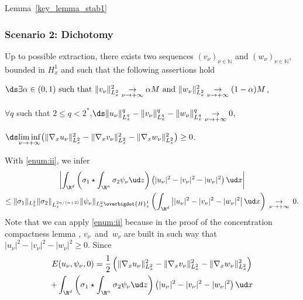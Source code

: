 \begin{ProofOf}{Lemma~\ref{key_lemma_stab1}}
\subsubsection*{Scenario 2: Dichotomy} Up to possible extraction, there exists two sequences $(v_{\nu})_{\nu\in\mathbb N}$ and $(w_{\nu})_{\nu\in\mathbb N}$, bounded in $H_{x}^{1}$
and such that the following assertions hold
\begin{enumeratei}
\item\label{enum:i}
$\ds \exists\alpha\in(0,1)\text{ such that }\|v_{\nu}\|_{L_{x}^{2}}^{2}\underset{\nu\to+\infty}{\to}\alpha M\text{ and }\|w_{\nu}\|_{L_{x}^{2}}^{2}\underset{\nu\to+\infty}{\to}(1-\alpha)M$,
\item
\label{enum:ii}
$\forall q$ such that $2\leq q<2^{*}$,\quad$\ds\|u_{\nu}\|_{L_{x}^{q}}^{q}-\|v_{\nu}\|_{L_{x}^{q}}^{q}-\|w_{\nu}\|_{L_{x}^{q}}^{q}\underset{\nu\to+\infty}{\to}0$,
\item
\label{enum:iii}
$\ds\underset{\nu\to+\infty}{\liminf}\bigl(\|\nabla_{x}u_{\nu}\|_{L_{x}^{2}}^{2}-\|\nabla_{x}v_{\nu}\|_{L_{x}^{2}}^{2}-\|\nabla_{x}w_{\nu}\|_{L_{x}^{2}}^{2}\bigr)\geq0$.
\end{enumeratei}
\noindent
With \eqref{enum:ii}, we infer
\begin{multline}\label{application_ii}
\left|\int_{\R^{d}}\left(\sigma_{1}\star\int_{\R^{n}}\sigma_{2}\psi_{\nu}\ud z\right)\left(|u_{\nu}|^{2}-|v_{\nu}|^{2}-|w_{\nu}|^{2}\right)\ud x\right|\\
\leq\|\sigma_{1}\|_{L_{x}^{2}}\|\sigma_{2}\|_{L_{z}^{2n/(n+2)}}\|\psi_{\nu}\|_{L_{x}^{2}\overbigdot{H}_{z}^{1}}\left(\int_{\R^{d}}\left||u_{\nu}|^{2}-|v_{\nu}|^{2}-|w_{\nu}|^{2}\right|\ud x\right)\,\underset{\nu\to +\infty}{\to}\,0.
\end{multline}
Note that we can apply \eqref{enum:ii} because in the proof of the concentration compactness lemma
\cite[Prop.\,1.7.6, sp. (1.7.11) \& (1.7.12)]{Caze}
\cite[Proof of Lem.\,I.1 \& Lem.\,III.1]{PLLcc1},
$v_{\nu}$~and~$w_{\nu}$ are built in such way that $|u_{\nu}|^{2}-|v_{\nu}|^{2}-|w_{\nu}|^{2}\geq 0$. Since\vspace*{-10pt}
\bgroup
{}
\begin{multline*}
E(u_{\nu},\psi_{\nu},0)=\frac{1}{2}\left(\|\nabla_{x}u_{\nu}\|_{L_{x}^{2}}^{2}-\|\nabla_{x}v_{\nu}\|_{L_{x}^{2}}^{2}-\|\nabla_{x}w_{\nu}\|_{L_{x}^{2}}^{2}\right)\\
+\int_{\R^{d}}\left(\sigma_{1}\star\int_{\R^{n}}\sigma_{2}\psi_{\nu}\ud z\right)\left(|u_{\nu}|^{2}-|v_{\nu}|^{2}-|w_{\nu}|^{2}\right)\ud x

\end{multline*}
\end{ProofOf}
